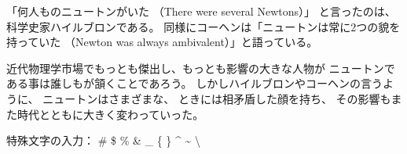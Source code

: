 \documentclass{jlreq}
\begin{document}
「何人ものニュートンがいた （There were several Newtons）」
と言ったのは、科学史家ハイルブロンである。%
同様にコーヘンは「ニュートンは常に2つの貌を持っていた%
（Newton was always ambivalent）」と語っている。

\noindent 近代物理学市場でもっとも傑出し、もっとも影響の大きな人物が
ニュートンである事は誰しもが頷くことであろう。
しかしハイルブロンやコーヘンの言うように、
ニュートンはさまざまな、%
ときには相矛盾した顔を持ち、
その影響もまた時代とともに大きく変わっていった。


特殊文字の入力：
\# \$ \% \& \_ \{ \} \^{} \~{} \textbackslash
\end{document}
